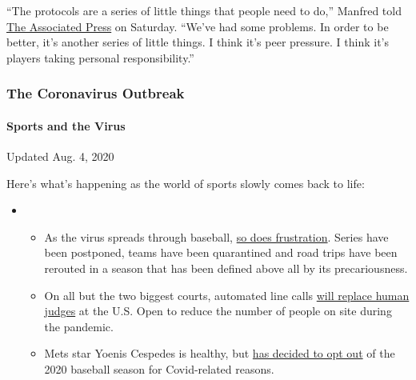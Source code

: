 ``The protocols are a series of little things that people need to do,''
Manfred told
\href{https://apnews.com/eff9d34788720e0b3d6df53c2779fd01}{The
Associated Press} on Saturday. ``We've had some problems. In order to be
better, it's another series of little things. I think it's peer
pressure. I think it's players taking personal responsibility.''

\hypertarget{the-coronavirus-outbreak}{%
\subsubsection{The Coronavirus
Outbreak}\label{the-coronavirus-outbreak}}

\hypertarget{sports-and-the-virus}{%
\paragraph{Sports and the Virus}\label{sports-and-the-virus}}

Updated Aug. 4, 2020

Here's what's happening as the world of sports slowly comes back to
life:

\begin{itemize}
\item
  \begin{itemize}
  \tightlist
  \item
    As the virus spreads through baseball,
    \href{https://www.nytimes.com/2020/08/03/sports/baseball/mlb-coronavirus-outbreak.html?action=click\&pgtype=Article\&state=default\&region=MAIN_CONTENT_2\&context=storylines_keepup}{so
    does frustration}. Series have been postponed, teams have been
    quarantined and road trips have been rerouted in a season that has
    been defined above all by its precariousness.
  \item
    On all but the two biggest courts, automated line calls
    \href{https://www.nytimes.com/2020/08/03/sports/tennis/us-open-hawkeye-line-judges.html?action=click\&pgtype=Article\&state=default\&region=MAIN_CONTENT_2\&context=storylines_keepup}{will
    replace human judges} at the U.S. Open to reduce the number of
    people on site during the pandemic.
  \item
    Mets star Yoenis Cespedes is healthy, but
    \href{https://www.nytimes.com/2020/08/02/sports/baseball/Yoenis-cespedes-opt-out-rule.html?action=click\&pgtype=Article\&state=default\&region=MAIN_CONTENT_2\&context=storylines_keepup}{has
    decided to opt out} of the 2020 baseball season for Covid-related
    reasons.
  \end{itemize}
\end{itemize}

